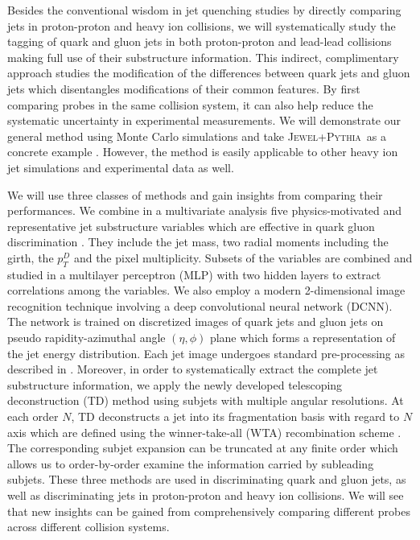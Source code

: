 \documentclass[notoc]{JHEP3}
\newcommand{\jwpy}{\textsc{Jewel+Pythia}~}
\begin{document}
Besides the conventional wisdom in jet quenching studies by directly comparing jets in proton-proton and heavy ion collisions, we will systematically study the tagging of quark and gluon jets in both proton-proton and lead-lead collisions making full use of their substructure information. This indirect, complimentary approach studies the modification of the differences between quark jets and gluon jets which disentangles modifications of their common features. By first comparing probes in the same collision system, it can also help reduce the systematic uncertainty in experimental measurements. We will demonstrate our general method using Monte Carlo simulations and take \jwpy as a concrete example \cite{Zapp:2013zya,KunnawalkamElayavalli:2016ttl}. However, the method is easily applicable to other heavy ion jet simulations \cite{} and experimental data as well.

We will use three classes of methods and gain insights from comparing their performances. We combine in a multivariate analysis five physics-motivated and representative jet substructure variables which are effective in quark gluon discrimination \cite{Gallicchio:2012ez}. They include the jet mass, two radial moments including the girth, the $p_T^D$ and the pixel multiplicity. Subsets of the variables are combined and studied in a multilayer perceptron (MLP) with two hidden layers to extract correlations among the variables. We also employ a modern 2-dimensional image recognition technique involving a deep convolutional neural network (DCNN). The network is trained on discretized images of quark jets and gluon jets on pseudo rapidity-azimuthal angle $(\eta,\phi)$ plane which forms a representation of the jet energy distribution. Each jet image undergoes standard pre-processing as described in \cite{deOliveira:2015xxd}. Moreover, in order to systematically extract the complete jet substructure information, we apply the newly developed telescoping deconstruction (TD) method using subjets with multiple angular resolutions. At each order $N$, TD deconstructs a jet into its fragmentation basis with regard to $N$ axis which are defined using the winner-take-all (WTA) recombination scheme \cite{Bertolini:2013iqa}. The corresponding subjet expansion can be truncated at any finite order which allows us to order-by-order examine the information carried by subleading subjets. These three methods are used in discriminating quark and gluon jets, as well as discriminating jets in proton-proton and heavy ion collisions. We will see that new insights can be gained from comprehensively comparing different probes across different collision systems.
\end{document}
